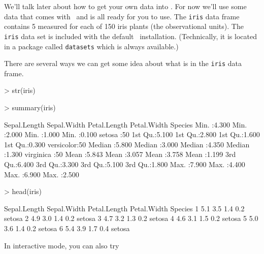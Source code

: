 We'll talk later about how to get your own data into \R.  For now we'll use 
some data that comes with \R\ and is all ready for you to use.
The \verb!iris! data frame contains 5  measured for each
of 150 iris plants (the observational units).  
The \verb!iris! data set is included with the default \R\ installation.  
(Technically, it is located in a package called \verb!datasets!  which is always available.)

There are several ways we can get some idea about what is in the \verb!iris! data frame.

\begin{Schunk}
\begin{Sinput}
> str(iris)
\end{Sinput}
\end{Schunk}

\begin{Schunk}
\begin{Sinput}
> summary(iris)
\end{Sinput}
\begin{Soutput}
  Sepal.Length    Sepal.Width     Petal.Length    Petal.Width          Species  
 Min.   :4.300   Min.   :2.000   Min.   :1.000   Min.   :0.100   setosa    :50  
 1st Qu.:5.100   1st Qu.:2.800   1st Qu.:1.600   1st Qu.:0.300   versicolor:50  
 Median :5.800   Median :3.000   Median :4.350   Median :1.300   virginica :50  
 Mean   :5.843   Mean   :3.057   Mean   :3.758   Mean   :1.199                  
 3rd Qu.:6.400   3rd Qu.:3.300   3rd Qu.:5.100   3rd Qu.:1.800                  
 Max.   :7.900   Max.   :4.400   Max.   :6.900   Max.   :2.500                  
\end{Soutput}
\end{Schunk}

\begin{Schunk}
\begin{Sinput}
> head(iris)
\end{Sinput}
\begin{Soutput}
  Sepal.Length Sepal.Width Petal.Length Petal.Width Species
1          5.1         3.5          1.4         0.2  setosa
2          4.9         3.0          1.4         0.2  setosa
3          4.7         3.2          1.3         0.2  setosa
4          4.6         3.1          1.5         0.2  setosa
5          5.0         3.6          1.4         0.2  setosa
6          5.4         3.9          1.7         0.4  setosa
\end{Soutput}
\end{Schunk}
In interactive mode, you can also try

